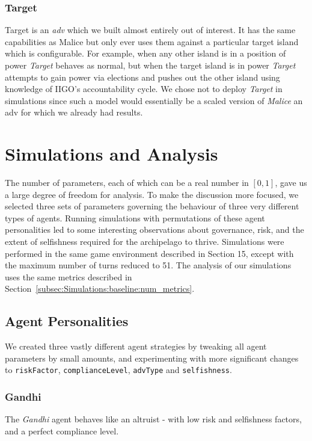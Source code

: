 \documentclass{article}
\begin{document}
\subsubsection{Target}
Target is an \emph{adv} which we built almost entirely out of interest. It has the same capabilities as Malice but only ever uses them against a particular target island which is configurable. For example, when any other island is in a position of power \emph{Target} behaves as normal, but when the target island is in power \emph{Target} attempts to gain power via elections and pushes out the other island using knowledge of IIGO's accountability cycle. We chose not to deploy \emph{Target} in simulations since such a model would essentially be a scaled version of \emph{Malice} an adv for which we already had results.

\section{Simulations and Analysis}
\label{sec:team3_simulation}

The number of parameters, each of which can be a real number in $[0,1]$, gave us a large degree of freedom for analysis. To make the discussion more focused, we selected three sets of parameters governing the behaviour of three very different types of agents. Running simulations with permutations of these agent personalities led to some interesting observations about governance, risk, and the extent of selfishness required for the archipelago to thrive. Simulations were performed in the same game environment described in Section 15, except with the maximum number of turns reduced to 51. The analysis of our simulations uses the same metrics described in Section~\ref{subsec:Simulations:baseline:num_metrics}.


\subsection{Agent Personalities} 
\label{section_agent_personalities}

We created three vastly different agent strategies by tweaking all agent parameters by small amounts, and experimenting with more significant changes to \texttt{riskFactor}, \texttt{complianceLevel}, \texttt{advType} and \texttt{selfishness}.

\subsubsection{Gandhi}
The \textit{Gandhi} agent behaves like an altruist - with low risk and selfishness factors, and a perfect compliance level.
\end{document}
